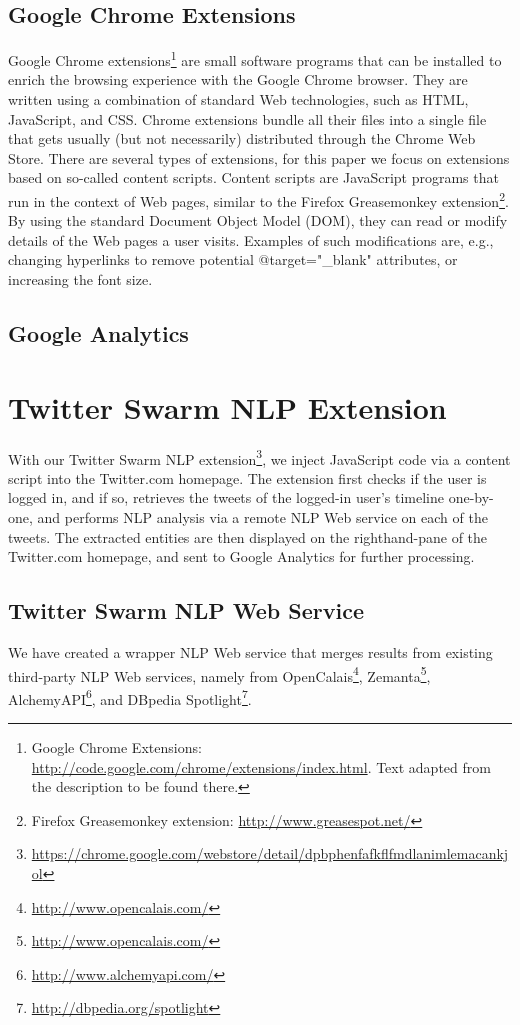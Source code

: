 \documentclass[runningheads,a4paper]{llncs}
\begin{document}
\subsection{Google Chrome Extensions}
Google Chrome extensions\footnote{Google Chrome Extensions: \url{http://code.google.com/chrome/extensions/index.html}. Text adapted from the description to be found there.} are small software programs that can be installed to enrich the browsing experience with the Google Chrome browser. They are written using a combination of standard Web technologies, such as HTML, JavaScript, and CSS. Chrome extensions bundle all their files into a single file that gets usually (but not necessarily) distributed through the Chrome Web Store. There are several types of extensions, for this paper we focus on extensions based on so-called content scripts. Content scripts are JavaScript programs that run in the context of Web pages, similar to the Firefox Greasemonkey extension\footnote{Firefox Greasemonkey extension: \url{http://www.greasespot.net/}}. By using the standard Document Object Model (DOM), they can read or modify details of the Web pages a user visits. Examples of such modifications are, e.g., changing hyperlinks to remove potential @target="\_blank" attributes, or increasing the font size.

\subsection{Google Analytics}
 
\section{Twitter Swarm NLP Extension}
With our Twitter Swarm NLP extension\footnote{\url{https://chrome.google.com/webstore/detail/dpbphenfafkflfmdlanimlemacankjol}}, we inject JavaScript code via a content script into the Twitter.com homepage. The extension first checks if the user is logged in, and if so, retrieves the tweets of the logged-in user's timeline one-by-one, and performs NLP analysis via a remote NLP Web service on each of the tweets. The extracted entities are then displayed on the righthand-pane of the Twitter.com homepage, and sent to Google Analytics for further processing.

\subsection{Twitter Swarm NLP Web Service}
We have created a wrapper NLP Web service that merges results from existing third-party NLP Web services, namely from OpenCalais\footnote{\url{http://www.opencalais.com/}}, Zemanta\footnote{\url{http://www.opencalais.com/}}, AlchemyAPI\footnote{\url{http://www.alchemyapi.com/}}, and DBpedia Spotlight\footnote{\url{http://dbpedia.org/spotlight}}.
\end{document}
